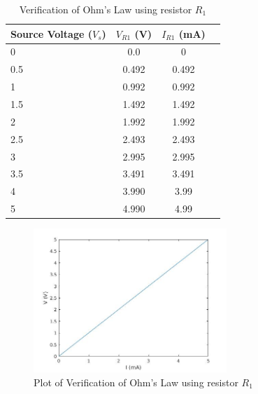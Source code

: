 \documentclass{article}
\begin{document}
        
      \begin{table}[!ht]
  \captionsetup{font=large}
  \centering
  \caption{ Verification of Ohm's Law using resistor $R_1$ }
  \label{tab: ohm1 }
  \begin{tabular}{   | l | c | c | r | }
  \hline

      Source Voltage ($V_s$) &     $V_{R1}$ (V) &    $I_{R1}$ (mA)     \\ \hline
      0 &    0.0 &    0     \\ \hline
      0.5 &     0.492 &    0.492     \\ \hline
      1 &    0.992 &    0.992     \\ \hline
      1.5 &    1.492 &    1.492     \\ \hline
      2 &    1.992 &    1.992     \\ \hline
      2.5 &    2.493 &    2.493     \\ \hline
      3 &    2.995 &    2.995     \\ \hline
      3.5 &    3.491 &    3.491     \\ \hline
      4 &    3.990 &    3.99     \\ \hline
      5 &    4.990 &    4.99     \\ \hline
  
  \end{tabular}
  \end{table}



    \begin{figure}[!ht]
  \centering
  \caption{Plot of Verification of Ohm's Law using resistor $R_1$\label{fig:resultPlot1}}
  \includegraphics[width=0.65\textwidth]{img/plot1.jpg}
  \end{figure}
\end{document}
